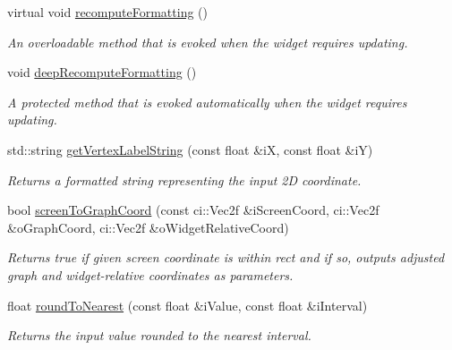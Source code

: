 \begin{DoxyCompactItemize}
\item 
\hypertarget{class_ui_plot_a11a0f4c5478a1c80536bf01d509320ae}{virtual void \hyperlink{class_ui_plot_a11a0f4c5478a1c80536bf01d509320ae}{recompute\-Formatting} ()}\label{class_ui_plot_a11a0f4c5478a1c80536bf01d509320ae}

\begin{DoxyCompactList}\small\item\em An overloadable method that is evoked when the widget requires updating. \end{DoxyCompactList}\item 
\hypertarget{class_ui_plot_ab88c5f30e3af27918d2c8b9d3ce6d1d6}{void \hyperlink{class_ui_plot_ab88c5f30e3af27918d2c8b9d3ce6d1d6}{deep\-Recompute\-Formatting} ()}\label{class_ui_plot_ab88c5f30e3af27918d2c8b9d3ce6d1d6}

\begin{DoxyCompactList}\small\item\em A protected method that is evoked automatically when the widget requires updating. \end{DoxyCompactList}\item 
\hypertarget{class_ui_plot_a0b2f5162c3586741bf0b9dc02e852d84}{std\-::string \hyperlink{class_ui_plot_a0b2f5162c3586741bf0b9dc02e852d84}{get\-Vertex\-Label\-String} (const float \&i\-X, const float \&i\-Y)}\label{class_ui_plot_a0b2f5162c3586741bf0b9dc02e852d84}

\begin{DoxyCompactList}\small\item\em Returns a formatted string representing the input 2\-D coordinate. \end{DoxyCompactList}\item 
\hypertarget{class_ui_plot_a0c1a3677e260b81311d7f9fceff9dfdc}{bool \hyperlink{class_ui_plot_a0c1a3677e260b81311d7f9fceff9dfdc}{screen\-To\-Graph\-Coord} (const ci\-::\-Vec2f \&i\-Screen\-Coord, ci\-::\-Vec2f \&o\-Graph\-Coord, ci\-::\-Vec2f \&o\-Widget\-Relative\-Coord)}\label{class_ui_plot_a0c1a3677e260b81311d7f9fceff9dfdc}

\begin{DoxyCompactList}\small\item\em Returns true if given screen coordinate is within rect and if so, outputs adjusted graph and widget-\/relative coordinates as parameters. \end{DoxyCompactList}\item 
\hypertarget{class_ui_plot_a16ab0e2694dfea588ae812bf90ffcfa7}{float \hyperlink{class_ui_plot_a16ab0e2694dfea588ae812bf90ffcfa7}{round\-To\-Nearest} (const float \&i\-Value, const float \&i\-Interval)}\label{class_ui_plot_a16ab0e2694dfea588ae812bf90ffcfa7}

\begin{DoxyCompactList}\small\item\em Returns the input value rounded to the nearest interval. \end{DoxyCompactList}\end{DoxyCompactItemize}
